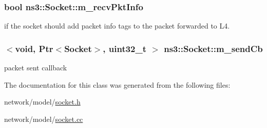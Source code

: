 \subsubsection[{\texorpdfstring{m\+\_\+recv\+Pkt\+Info}{m_recvPktInfo}}]{\setlength{\rightskip}{0pt plus 5cm}bool ns3\+::\+Socket\+::m\+\_\+recv\+Pkt\+Info\hspace{0.3cm}{\ttfamily [protected]}}\hypertarget{classns3_1_1Socket_a760f9005e248682fe83c0332189d782f}{}\label{classns3_1_1Socket_a760f9005e248682fe83c0332189d782f}


if the socket should add packet info tags to the packet forwarded to L4. 

\subsubsection[{\texorpdfstring{m\+\_\+send\+Cb}{m_sendCb}}]{$<$void, {\bf Ptr}$<${\bf Socket}$>$, uint32\+\_\+t $>$ ns3\+::\+Socket\+::m\+\_\+send\+Cb\hspace{0.3cm}{\ttfamily [private]}}\hypertarget{classns3_1_1Socket_acafb95acab16c54a933f8e28dabfbadf}{}\label{classns3_1_1Socket_acafb95acab16c54a933f8e28dabfbadf}


packet sent callback 



The documentation for this class was generated from the following files\+:\begin{DoxyCompactItemize}
\item 
network/model/\hyperlink{socket_8h}{socket.\+h}\item 
network/model/\hyperlink{socket_8cc}{socket.\+cc}\end{DoxyCompactItemize}
